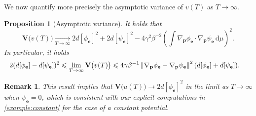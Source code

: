 \documentclass[11pt,a4paper]{article}
\newcommand{\var}[0]{\mathbf{V}}
\newcommand{\grad}{\nabla}
\newcommand{\vect}[1]{\boldsymbol{\mathbf #1}}
\renewcommand{\d}{\mathrm d}
\theoremstyle{plain}
\newtheorem{proposition}{Proposition}[section]
\newtheorem{remark}{Remark}[section]
\numberwithin{equation}{section}
\renewcommand{\leq}{\leqslant}
\begin{document}
We now quantify more precisely the asymptotic variance of $v(T)$ as $T \to \infty$.
\begin{proposition}
    [Asymptotic variance]
    \label{proposition:asymptotic_variance}
    It holds that
    \begin{equation}
        \label{eq:asymptotic_variance}
        \var\bigl(v(T)\bigr) \xrightarrow[T \to \infty]{}
        2 d[\phi_{\vect e}]^2 + 2 d[\psi_{\vect e}]^2 - 4 \gamma^2 \beta^{-2} \left( \int \grad_{\vect p} \phi_{\vect e} \cdot \grad_{\vect p} \psi_{\vect e} \, \d \mu \right)^2.
    \end{equation}
    In particular, it holds
    \begin{align}
        \label{eq:bounds_asymptotic_variance}
        2(d[\phi_{\vect e}] - d[\psi_{\vect e}])^2
        \leq \lim_{T \to \infty} \var \bigl(v(T)\bigr)
        &\leq 4 \gamma \beta^{-1} \norm{\grad_{\vect p} \phi_{\vect e} - \grad_{\vect p} \psi_{\vect e}}^2 (d[\phi_{\vect e}] + d[\psi_{\vect e}]).
    \end{align}
\end{proposition}
\begin{remark}
    This result implies that $\var\bigl(u(T)\bigr) \to 2 d[\phi_{\vect e}]^2$ in the limit as $T \to \infty$ when $\psi_{\vect e} = 0$,
    which is consistent with our explicit computations in \cref{example:constant} for the case of a constant potential.
\end{remark}
\end{document}
